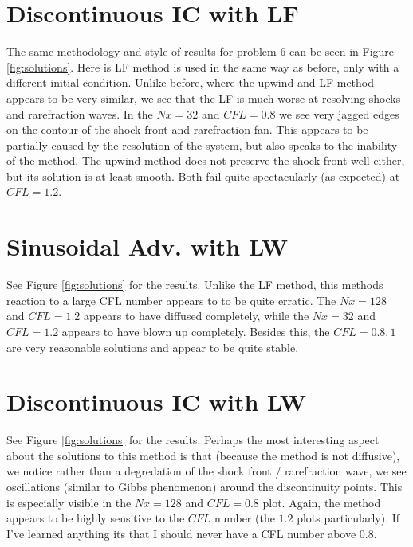\documentclass{article}
\begin{document}
\section{Discontinuous IC with LF}

The same methodology and style of results for problem 6 can be seen in Figure
\ref{fig:solutions}. Here is LF method is used in the same way as before, only
with a different initial condition. Unlike before, where the upwind and LF
method appears to be very similar, we see that the LF is much worse at resolving
shocks and rarefraction waves. In the $Nx = 32$ and $CFL = 0.8$ we see very
jagged edges on the contour of the shock front and rarefraction fan. This
appears to be partially caused by the resolution of the system, but also speaks
to the inability of the method. The upwind method does not preserve the shock
front well either, but its solution is at least smooth. Both fail quite
spectacularly (as expected) at $CFL = 1.2$. 

\section{Sinusoidal Adv. with LW}

See Figure \ref{fig:solutions} for the results. Unlike the LF method, this
methods reaction to a large CFL number appears to to be quite erratic. The $Nx =
128$ and $CFL = 1.2$ appears to have diffused completely, while the $Nx = 32$
and $CFL = 1.2$ appears to have blown up completely. Besides this, the $CFL =
0.8, 1$ are very reasonable solutions and appear to be quite stable. 

\section{Discontinuous IC with LW}

See Figure \ref{fig:solutions} for the results. Perhaps the most interesting
aspect about the solutions to this method is that (because the method is not
diffusive), we notice rather than a degredation of the shock front /
rarefraction wave, we see oscillations (similar to Gibbs phenomenon) around the
discontinuity points. This is especially visible in the $Nx = 128$ and $CFL =
0.8$ plot. Again, the method appears to be highly sensitive to the $CFL$ number
(the $1.2$ plots particularly). If I've learned anything its that I should never
have a CFL number above $0.8$. 
\end{document}
